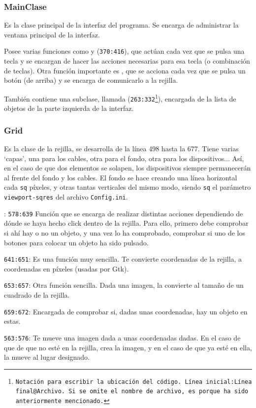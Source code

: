 \documentclass[a4paper, 11pt]{report} %
\begin{document}
\subsubsection{MainClase}
Es la clase principal de la interfaz del programa. Se encarga de administrar la ventana principal de la interfaz.

Posee varias funciones como  y  (\texttt{370:416}), que actúan cada vez que se pulsa una tecla y se encargan de hacer las acciones necesarias para esa tecla (o combinación de teclas). Otra función importante es , que se acciona cada vez que se pulsa un botón (de arriba) y se encarga de comunicarlo a la rejilla.

También contiene una subclase, llamada  (\texttt{263:332\footnote{Notación para escribir la ubicación del código. Línea inicial:Línea final@Archivo. Si se omite el nombre de archivo, es porque ha sido anteriormente mencionado.}}), encargada de la lista de objetos de la parte izquierda de la interfaz.

\newpage
\subsubsection{Grid}
Es la clase de la rejilla, se desarrolla de la línea 498 hasta la 677. Tiene varias `capas', una para los cables, otra para el fondo, otra para los dispositivos... Así, en el caso de que dos elementos se solapen, los dispositivos siempre permanecerán al frente del fondo y los cables. El fondo se hace creando una línea horizontal cada \texttt{sq} píxeles, y otras tantas verticales del mismo modo, siendo \texttt{sq} el parámetro \texttt{viewport-sqres} del archivo \texttt{Config.ini}.

\begin{description}
\item {}: \texttt{578:639} Función que se encarga de realizar distintas acciones dependiendo de dónde se haya hecho click dentro de la rejilla. Para ello, primero debe comprobar si ahí hay o no un objeto, y una vez lo ha comprobado, comprobar si uno de los botones para colocar un objeto ha sido pulsado.
\item {} \texttt{641:651}: Es una función muy sencilla. Te convierte coordenadas de la rejilla, a coordenadas en píxeles (usadas por Gtk).
\item {} \texttt{653:657}: Otra función sencilla. Dada una imagen, la convierte al tamaño de un cuadrado de la rejilla.
\item {} \texttt{659:672}: Encargada de comprobar si, dadas unas coordenadas, hay un objeto en estas.
\item {} \texttt{563:576}: Te mueve una imagen dada a unas coordenadas dadas. En el caso de que de que no esté en la rejilla, crea la imagen, y en el caso de que ya esté en ella, la mueve al lugar designado.
\end{description}
\end{document}

